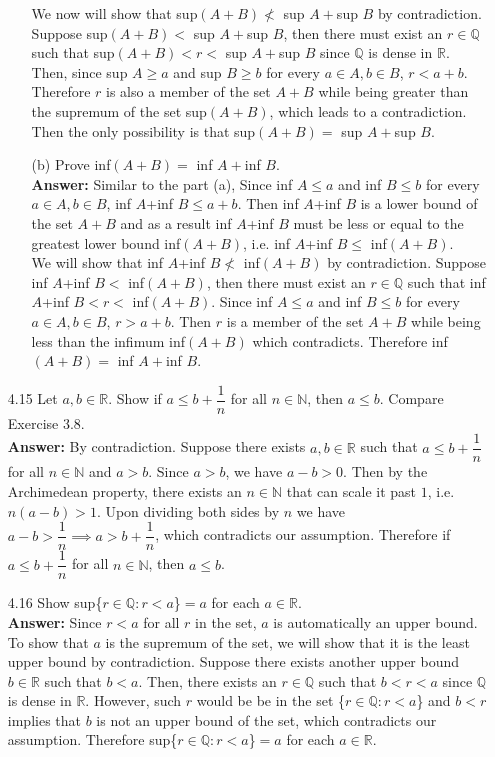 \documentclass{article}
\begin{document}
\begin{itemize}
\begin{itemize}
                    We now will show that sup$(A+B)\nless$ sup $A+$sup $B$ by contradiction. Suppose sup$(A+B)<$ sup $A+$sup $B$, then there must exist an $r\in\mathbb{Q}$ such that sup$(A+B)<r<$ sup $A+$sup $B$ since $\mathbb{Q}$ is dense in $\mathbb{R}$. Then, since sup $A\geq a$ and sup $B\geq b$ for every $a\in A, b\in B$, $r<a+b$. Therefore $r$ is also a member of the set $A+B$ while being greater than the supremum of the set sup$(A+B)$, which leads to a contradiction. Then the only possibility is that sup$(A+B)=$ sup $A+$sup $B$.
              \item [(b)] Prove inf$(A+B)=$ inf $A+$inf $B$.\\
                    \textbf{Answer: } Similar to the part (a), Since inf $A\leq a$ and inf $B\leq b$ for every $a\in A, b\in B$, inf $A$+inf $B\leq a+b$. Then inf $A$+inf $B$ is a lower bound of the set $A+B$ and as a result inf $A$+inf $B$ must be less or equal to the greatest lower bound inf$(A+B)$, i.e. inf $A$+inf $B\leq$ inf$(A+B)$.\\
                    We will show that inf $A$+inf $B\nless$ inf$(A+B)$ by contradiction. Suppose inf $A$+inf $B<$ inf$(A+B)$, then there must exist an $r\in\mathbb{Q}$ such that inf $A$+inf $B<r<$ inf$(A+B)$. Since inf $A\leq a$ and inf $B\leq b$ for every $a\in A, b\in B$, $r>a+b$. Then $r$ is a member of the set $A+B$ while being less than the infimum inf$(A+B)$ which contradicts. Therefore inf$(A+B)=$ inf $A+$inf $B$.
          \end{itemize}
    \item [4.15] Let $a,b\in\mathbb{R}$. Show if $a\leq b+\dfrac{1}{n}$ for all $n\in\mathbb{N}$, then $a\leq b$. Compare Exercise 3.8.\\
          \textbf{Answer: } By contradiction. Suppose there exists $a,b\in\mathbb{R}$ such that $a\leq b+\dfrac{1}{n}$ for all $n\in\mathbb{N}$ and $a>b$. Since $a>b$, we have $a-b>0$. Then by the Archimedean property, there exists an $n\in\mathbb{N}$ that can scale it past $1$, i.e. $n(a-b)>1$. Upon dividing both sides by $n$ we have $a-b>\dfrac{1}{n}\implies a>b+\dfrac{1}{n}$, which contradicts our assumption. Therefore if $a\leq b+\dfrac{1}{n}$ for all $n\in\mathbb{N}$, then $a\leq b$.
    \item [4.16] Show sup\{$r\in\mathbb{Q}:r<a$\}$=a$ for each $a\in\mathbb{R}$.\\
          \textbf{Answer: } Since $r<a$ for all $r$ in the set, $a$ is automatically an upper bound. To show that $a$ is the supremum of the set, we will show that it is the least upper bound by contradiction. Suppose there exists another upper bound $b\in\mathbb{R}$ such that $b<a$. Then, there exists an $r\in\mathbb{Q}$ such that $b<r<a$ since $\mathbb{Q}$ is dense in $\mathbb{R}$. However, such $r$ would be be in the set \{$r\in\mathbb{Q}:r<a$\} and $b<r$ implies that $b$ is not an upper bound of the set, which contradicts our assumption. Therefore sup\{$r\in\mathbb{Q}:r<a$\}$=a$ for each $a\in\mathbb{R}$.

\end{itemize}
\end{document}
